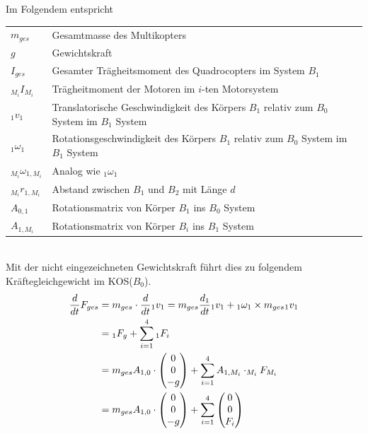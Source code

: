 Im Folgendem entspricht \\
\begin{tabular}[t]{|l|l|}
  \hline
  $m_{ges}$ & Gesamtmasse des Multikopters \\ 
  $g$     & Gewichtskraft \\
  $I_{ges}$ & Gesamter Trägheitsmoment des Quadrocopters im System $B_1$\\
  ${_{M_i} I_{M_i}}$ & Trägheitmoment der Motoren im $i$-ten Motorsystem\\
  ${_{1}v_{1}}$ & Translatorische Geschwindigkeit des Körpers $B_1$ relativ zum $B_0$ System im $B_1$ System \\
  ${_{1}\omega_{1}}$ & Rotationsgeschwindigkeit des Körpers $B_1$ relativ zum $B_0$ System im $B_1$ System \\
  ${_{M_i} {\omega}_{1, M_i}}$ & Analog wie ${_{1}\omega_{1}}$\\
  ${_{M_i} {r}_{1, M_i}}$ & Abstand zwischen $B_{1}$ und $B_{2}$ mit Länge $d$ \\
  $A_{0,1}$ & Rotationsmatrix von Körper $B_1$ ins $B_0$ System \\
  $A_{1,M_i}$ & Rotationsmatrix von Körper $B_i$ ins $B_1$ System\\
  \hline
\end{tabular}\\

Mit der nicht eingezeichneten Gewichtskraft führt dies zu folgendem Kräftegleichgewicht im KOS($B_0$).
\begin{align}
    \frac{d}{dt} F_{ges} &= m_{ges} \cdot \frac{d}{dt} {_{1}v_{1}} = m_{ges} \frac{d_1}{dt} {_{1}v_{1}} + {_{1}\omega_{1}} \times m_{ges} {_{1}v_{1}} \\
    &=  {_{1}F_g} + \sum_{i = 1}^{4}{_{1}F_{i}}  \\\notag
    &= m_{ges} A_{1, 0} \cdot \begin{pmatrix} 0 \\ 0 \\ -g \end{pmatrix} + \sum_{i = 1}^4 {A_{1, M_i} \cdot _{M_i}F_{M_i}} \\
    &= m_{ges} A_{1, 0} \cdot \begin{pmatrix} 0 \\ 0 \\ -g \end{pmatrix} + \sum_{i = 1}^4 {\begin{pmatrix} 0 \\ 0 \\ F_i \end{pmatrix}}
\end{align}

